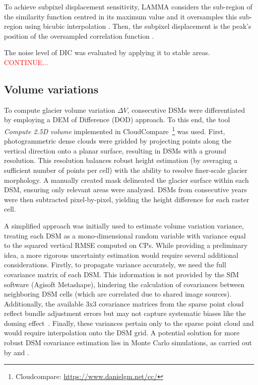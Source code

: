 To achieve subpixel displacement sensitivity, LAMMA considers the sub-region of the similarity function centred 
in its maximum value and it oversamples this sub-region using bicubic interpolation \citep{Dematteis2022}.
Then, the subpixel displacement is the peak's position of the oversampled correlation function \citep{Debella_Gilo2011}.
 
The noise level of DIC was evaluated by applying it to stable areas. \textcolor{red}{CONTINUE...}

\subsection{Volume variations}\label{sec:3:method_volumes}

To compute glacier volume variation $ \Delta V $, consecutive DSMs were differentiated
by employing a DEM of Difference (DOD) approach.
To this end, the tool \textit{Compute 2.5D volume} implemented in 
CloudCompare~\footnote{Cloudcompare: \url{https://www.danielgm.net/cc/}} was used.
First, photogrammetric dense clouds were gridded by projecting points along the vertical
direction onto a planar surface, resulting in DSMs with a  ground resolution.
This resolution balances robust height estimation (by averaging a sufficient number of points per cell) 
with the ability to resolve finer-scale glacier morphology.
A manually created mask delineated the glacier surface within each DSM, ensuring only 
relevant areas were analyzed.  
DSMs from consecutive years were then subtracted pixel-by-pixel, yielding the height 
difference for each raster cell.

A simplified approach was initially used to estimate volume variation variance, 
treating each DSM as a mono-dimensional random variable with variance equal to the squared 
vertical RMSE computed on CPs.  
While providing a preliminary idea, a more rigorous uncertainty estimation would require 
several additional considerations.
Firstly, to propagate variance accurately, we need the full covariance matrix of each DSM. 
This information is not provided by the SfM software (Agisoft Metashape), hindering the 
calculation of covariances between neighboring DSM cells (which are correlated due to 
shared image sources).
Additionally, the available 3x3 covariance matrices from the sparse point cloud reflect
bundle adjustment errors but may not capture systematic biases like the doming 
effect~\citep{James2014_mitigating, James2020_mitigating2}.
Finally, these variances pertain only to the sparse point cloud and would require 
interpolation onto the DSM grid.
A potential solution for more robust DSM covariance estimation lies in Monte Carlo simulations, 
as carried out by \cite{James2017_3duncertainty} and \cite{Roncella2021_montecarlo}.

